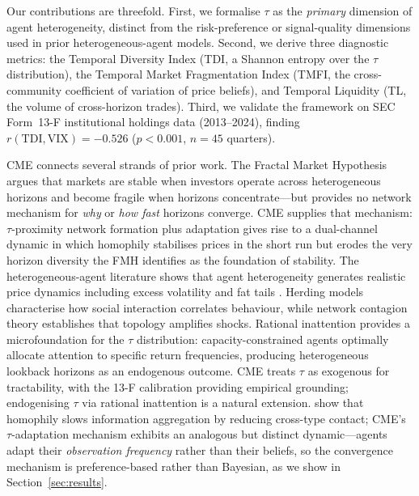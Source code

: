 \documentclass[preprint,12pt,authoryear]{elsarticle}
\begin{document}
Our contributions are threefold. First, we formalise $\tau$ as the
\emph{primary} dimension of agent heterogeneity, distinct from the
risk-preference or signal-quality dimensions used in prior heterogeneous-agent
models.
Second, we derive three diagnostic metrics: the Temporal Diversity Index
(TDI, a Shannon entropy over the $\tau$ distribution), the Temporal Market
Fragmentation Index (TMFI, the cross-community coefficient of variation of
price beliefs), and Temporal Liquidity (TL, the volume of cross-horizon
trades).
Third, we validate the framework on SEC Form~13-F institutional holdings
data (2013--2024), finding $r(\mathrm{TDI},\mathrm{VIX}) = -0.526$
($p < 0.001$, $n = 45$ quarters).

CME connects several strands of prior work.
The Fractal Market Hypothesis \citep{peters1994} argues that markets are
stable when investors operate across heterogeneous horizons and become
fragile when horizons concentrate---but provides no network mechanism for
\emph{why} or \emph{how fast} horizons converge.
CME supplies that mechanism: $\tau$-proximity network formation plus
adaptation gives rise to a dual-channel dynamic in which homophily
stabilises prices in the short run but erodes the very horizon diversity
the FMH identifies as the foundation of stability.
The heterogeneous-agent literature \citep{arthur1997, lebaron2001} shows
that agent heterogeneity generates realistic price dynamics including excess
volatility and fat tails \citep{cont2001}.
Herding models \citep{bikhchandani1992, devenow1996} characterise how
social interaction correlates behaviour, while network contagion theory
\citep{acemoglu2015} establishes that topology amplifies shocks.
Rational inattention \citep{sims2003, caplin2015} provides a
microfoundation for the $\tau$ distribution: capacity-constrained agents
optimally allocate attention to specific return frequencies, producing
heterogeneous lookback horizons as an endogenous outcome.
CME treats $\tau$ as exogenous for tractability, with the 13-F calibration
providing empirical grounding; endogenising $\tau$ via rational inattention
is a natural extension.
\citet{golub2012} show that homophily slows information aggregation by
reducing cross-type contact; CME's $\tau$-adaptation mechanism exhibits an
analogous but distinct dynamic---agents adapt their \emph{observation
frequency} rather than their beliefs, so the convergence mechanism is
preference-based rather than Bayesian, as we show in
Section~\ref{sec:results}.

\end{document}
